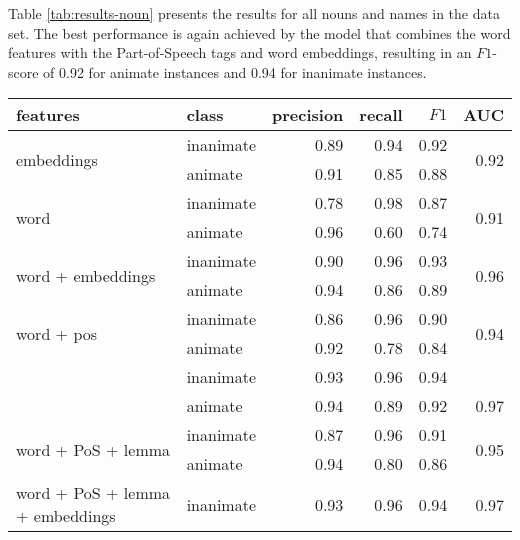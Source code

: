 \documentclass[a4paper,UKenglish]{oasics}
\begin{document}
Table \ref{tab:results-noun} presents the results for all nouns and
names in the data set. The best performance is again achieved by the
model that combines the word features with the Part-of-Speech tags and
word embeddings, resulting in an $F1$-score of 0.92 for animate
instances and 0.94 for inanimate instances.


\begin{table}
\centering
\begin{tabular}{llrrrr}
\toprule
features & class &  precision &  recall & $F1$ &  AUC \\
\midrule
\multirow{2}{*}{embeddings}                            & inanimate     &       0.89 &    0.94 &    0.92 & \multirow{2}{*}{0.92} \\
                                                       & animate       &       0.91 &    0.85 &    0.88 &  \\
\multirow{2}{*}{word}                                  & inanimate     &       0.78 &    0.98 &    0.87 & \multirow{2}{*}{0.91} \\
                                                       & animate       &       0.96 &    0.60 &    0.74 &  \\
\multirow{2}{*}{word + embeddings}                     & inanimate     &       0.90 &    0.96 &    0.93 & \multirow{2}{*}{0.96} \\
                                                       & animate       &       0.94 &    0.86 &    0.89 &  \\
\multirow{2}{*}{word + pos}                            & inanimate     &       0.86 &    0.96 &    0.90 & \multirow{2}{*}{0.94} \\
                                                       & animate       &       0.92 &    0.78 &    0.84 &  \\
\rowcolor{Gray}                                        & inanimate     &       0.93 &    0.96 &    0.94 &  \\
\rowcolor{Gray}\multirow{-2}{*}{word + PoS + embeddings} & animate       &       0.94 &    0.89 &    0.92 &\multirow{-2}{*}{0.97}  \\
\multirow{2}{*}{word + PoS + lemma}                    & inanimate     &       0.87 &    0.96 &    0.91 & \multirow{2}{*}{0.95} \\
                                                       & animate       &       0.94 &    0.80 &    0.86 &  \\
\multirow{2}{*}{word + PoS + lemma + embeddings}       & inanimate     &       0.93 &    0.96 &    0.94 & \multirow{2}{*}{0.97} \\

\end{tabular}
\end{table}
\end{document}
